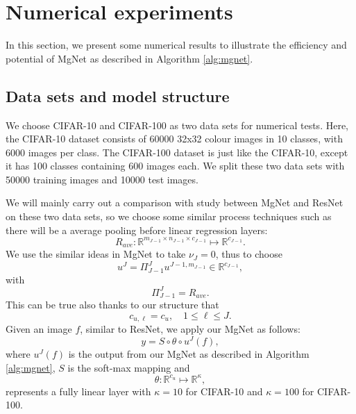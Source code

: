 \section{Numerical experiments}\label{sec:numerics}
In this section, we present some numerical results to illustrate the
efficiency and potential of MgNet as described in Algorithm
\ref{alg:mgnet}.

\subsection{Data sets and model structure }
We choose CIFAR-10 and CIFAR-100 
\cite{krizhevsky2009learning}
as two data sets for numerical tests. 
Here, the CIFAR-10 dataset consists of 60000 32x32 colour 
images in 10 classes, with 6000 images per class. 
The CIFAR-100 dataset is just like the CIFAR-10, 
except it has 100 classes containing 600 images each. 
We split these two data sets with 50000 training images 
and 10000 test images. 


We will mainly carry out
 a comparison with study between MgNet and  ResNet \cite{he2016deep} 
on these two data sets, so we choose some 
similar process techniques such as there will 
be a average pooling before linear regression
layers:
\begin{equation}\label{eq:ave-pooling}
R_{ave}: \mathbb{R}^{m_{J-1} \times n_{J-1} \times c_{J-1}} \mapsto \mathbb{R}^{c_{J-1}}.
\end{equation}
We use the similar ideas in MgNet to take $\nu_{J} = 0$, thus to choose 
$$
u^{J} = \Pi_{J-1}^J u^{J-1, m_{J-1}} \in \mathbb{R}^{c_{J-1}},
$$
with
$$
\Pi_{J-1}^J  = R_{ave}.
$$
This can be true also thanks to our structure that 
\begin{equation}\label{eq:c_u}
c_{u,\ell} = c_{u}, \quad 1 \le \ell \le J.
\end{equation}
Given an image $f$, similar to ResNet, we apply our MgNet as follows:
\begin{equation}\label{final-mg}
y = S \circ \theta \circ u^{J}(f),
\end{equation}
where $u^J(f)$ is the output from our MgNet as described in Algorithm
\ref{alg:mgnet},  $S$ is the soft-max mapping  and 
\begin{equation}\label{final-theta}
\theta: \mathbb{R}^{c_u} \mapsto \mathbb{R}^\kappa,
\end{equation}
represents a fully linear layer with $\kappa = 10$ for CIFAR-10 and 
$\kappa = 100$ for CIFAR-100.

